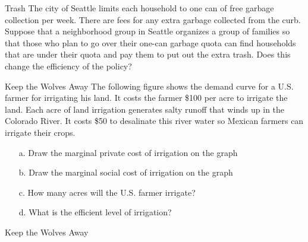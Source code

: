 \documentclass{beamer}
\begin{document}
\begin{frame}{Trash}
    The city of Seattle limits each household to one can of free garbage collection per week. There are fees for any extra garbage collected from the curb. Suppose that a neighborhood group in Seattle organizes a group of families so that those who plan to go over their one-can garbage quota can find households that are under their quota and pay them to put out the extra trash. Does this change the efficiency of the policy?
\end{frame}

\begin{frame}{Keep the Wolves Away}
    The following figure shows the demand curve for a U.S. farmer for irrigating his land. It costs the farmer \$100 per acre to irrigate the land. Each acre of land irrigation generates salty runoff that winds up in the Colorado River. It costs \$50 to desalinate this river water so Mexican farmers can irrigate their crops. 
    \begin{itemize}
        \item[a.] Draw the marginal private cost of irrigation on the graph
        \item[b.] Draw the marginal social cost of irrigation on the graph
        \item[c.] How many acres will the U.S. farmer irrigate?
        \item[d.] What is the efficient level of irrigation?
    \end{itemize}
\end{frame}

\begin{frame}{Keep the Wolves Away}
    \begin{center}
    \end{center}
\end{frame}
\end{document}

